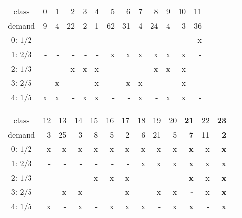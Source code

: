\begin{tabular*}{1\linewidth}{@{\extracolsep{\fill}} c|rrrrrrrrrrrr}
class	&0	&1	&2	&3	&4	&5	&6	&7	&8	&9	&10	&11	\\
demand	&9	&4	&22	&2	&1	&62	&31	&4	&24	&4	&3	&36	\\
  \hline                        
0: $1/2$	&-	&-	&-	&-	&-	&-	&-	&-	&-	&-	&-  &x \\
1: $2/3$	&-	&-	&-	&-	&-	&x	&x	&x	&x	&x	&x  &- \\
2: $1/3$	&-	&-	&x	&x	&x	&-	&-	&-	&x	&x	&x  &- \\
3: $2/5$	&-	&x	&-	&-	&x	&-	&x	&x	&-	&-	&x  &- \\
4: $1/5$	&x	&x	&-	&x	&x	&-	&-	&x	&-	&x	&x  &- \\
\end{tabular*}

\vspace{1cm}

\begin{tabular*}{1\linewidth}{@{\extracolsep{\fill}} c|rrrrrrrrrrrrr}
class		&12	&13	&14	&15	&16	&17	&18	&19	&20	&\textbf{21} &22 &\textbf{23}\\
demand		&3	&25	&3	&8	&5	&2	&6	&21	&5	&\textbf{7 } &11 &\textbf{2}\\
  \hline
0: $1/2$	&x	&x	&x	&x	&x	&x	&x	&x	&x	&\textbf{x } &x	 &\textbf{x}\\
1: $2/3$	&-	&-	&-	&-	&-	&-	&x	&x	&x	&\textbf{x } &x	 &\textbf{x}\\
2: $1/3$	&-	&-	&-	&x	&x	&x	&-	&-	&-	&\textbf{x } &x	 &\textbf{x}\\
3: $2/5$	&-	&x	&x	&-	&-	&x	&-	&x	&x	&\textbf{- } &x	 &\textbf{x}\\
4: $1/5$	&x	&-	&x	&-	&x	&x	&x	&-	&x	&\textbf{x } &-	 &\textbf{x}\\
\end{tabular*}
